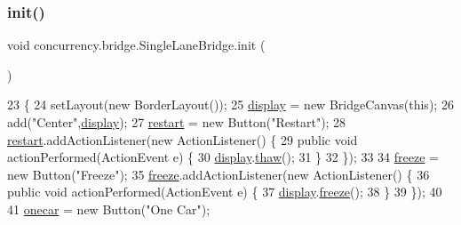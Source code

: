 \subsubsection{\texorpdfstring{init()}{init()}}
{\footnotesize\ttfamily void concurrency.\+bridge.\+Single\+Lane\+Bridge.\+init (\begin{DoxyParamCaption}{ }\end{DoxyParamCaption})\hspace{0.3cm}{\ttfamily [inline]}}


\begin{DoxyCode}
23                        \{
24         setLayout(\textcolor{keyword}{new} BorderLayout());
25         \mbox{\hyperlink{classconcurrency_1_1bridge_1_1_single_lane_bridge_a9e5dd77ddd8d067890e37bdb92bcb5e5}{display}} = \textcolor{keyword}{new} BridgeCanvas(\textcolor{keyword}{this});
26         add(\textcolor{stringliteral}{"Center"},\mbox{\hyperlink{classconcurrency_1_1bridge_1_1_single_lane_bridge_a9e5dd77ddd8d067890e37bdb92bcb5e5}{display}});
27         \mbox{\hyperlink{classconcurrency_1_1bridge_1_1_single_lane_bridge_ad2e50f105be9d4a771650080d1aa586f}{restart}} = \textcolor{keyword}{new} Button(\textcolor{stringliteral}{"Restart"});
28         \mbox{\hyperlink{classconcurrency_1_1bridge_1_1_single_lane_bridge_ad2e50f105be9d4a771650080d1aa586f}{restart}}.addActionListener(\textcolor{keyword}{new} ActionListener() \{
29            \textcolor{keyword}{public} \textcolor{keywordtype}{void} actionPerformed(ActionEvent e) \{
30              \mbox{\hyperlink{classconcurrency_1_1bridge_1_1_single_lane_bridge_a9e5dd77ddd8d067890e37bdb92bcb5e5}{display}}.\mbox{\hyperlink{classconcurrency_1_1bridge_1_1_bridge_canvas_af3ce80d4ece527c54b0e7eb74ce75af4}{thaw}}();
31            \}
32         \});
33         
34         \mbox{\hyperlink{classconcurrency_1_1bridge_1_1_single_lane_bridge_ae038eac0222c7e87f00367f7dad2ff77}{freeze}} = \textcolor{keyword}{new} Button(\textcolor{stringliteral}{"Freeze"});
35         \mbox{\hyperlink{classconcurrency_1_1bridge_1_1_single_lane_bridge_ae038eac0222c7e87f00367f7dad2ff77}{freeze}}.addActionListener(\textcolor{keyword}{new} ActionListener() \{
36            \textcolor{keyword}{public} \textcolor{keywordtype}{void} actionPerformed(ActionEvent e) \{
37              \mbox{\hyperlink{classconcurrency_1_1bridge_1_1_single_lane_bridge_a9e5dd77ddd8d067890e37bdb92bcb5e5}{display}}.\mbox{\hyperlink{classconcurrency_1_1bridge_1_1_bridge_canvas_a777eb5e18c6ee3a77ef029230101f2d1}{freeze}}();
38            \}
39         \});
40         
41         \mbox{\hyperlink{classconcurrency_1_1bridge_1_1_single_lane_bridge_a24f20b97d3e6eac70eee68a5b9a41edb}{onecar}} = \textcolor{keyword}{new} Button(\textcolor{stringliteral}{"One Car"});

\end{DoxyCode}
